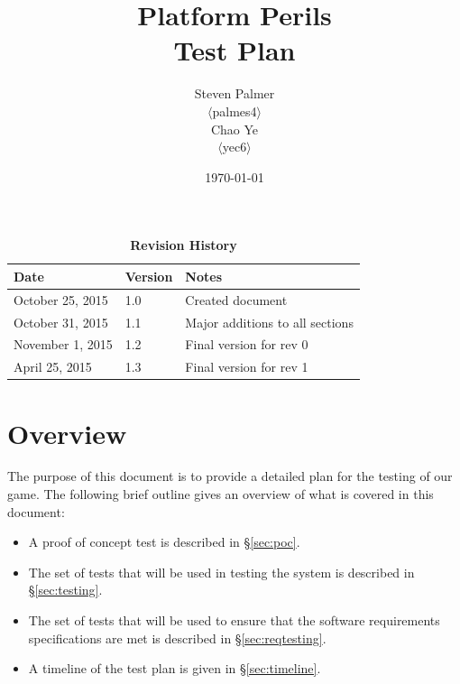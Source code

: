 \documentclass[12pt, titlepage]{article}
\begin{document}
\title{\bf Platform Perils\\[\baselineskip]\Large Test Plan}
\author{Steven Palmer\\$\langle$palmes4$\rangle$\\Chao Ye\\$\langle$yec6$\rangle$}
\date{\today}
	
\maketitle

\tableofcontents
\listoftables
\listoffigures


\begin{table}[bp]
\caption*{\bf Revision History}
\begin{tabularx}{\textwidth}{p{3.5cm}p{2cm}X}
\toprule {\bf Date} & {\bf Version} & {\bf Notes}\\
\midrule
October 25, 2015 & 1.0 & Created document\\
October 31, 2015 & 1.1 & Major additions to all sections\\
November 1, 2015 & 1.2 & Final version for rev 0\\
April 25, 2015 & 1.3 & Final version for rev 1\\
\bottomrule
\end{tabularx}
\end{table}

\newpage


\section{Overview}
The purpose of this document is to provide a detailed plan for the testing of our game.  The following brief outline gives an overview of what is covered in this document:

\begin{itemize}
  \item A proof of concept test is described in \hyperref[sec:poc]{\S\ref*{sec:poc}}.
  \item The set of tests that will be used in testing the system is described in \hyperref[sec:testing]{\S\ref*{sec:testing}}.
  \item The set of tests that will be used to ensure that the software requirements specifications are met is described in \hyperref[sec:reqtesting]{\S\ref*{sec:reqtesting}}.
  \item A timeline of the test plan is given in \hyperref[sec:timeline]{\S\ref*{sec:timeline}}.
\end{itemize}
\end{document}
